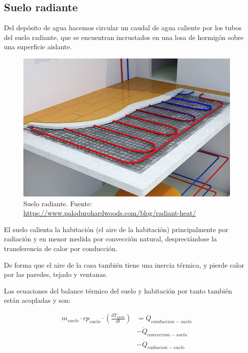 \subsection{Suelo radiante}

Del depósito de agua hacemos circular un caudal de agua caliente por los
tubos del suelo radiante, que se encuentran incrustados en una losa de hormigón
sobre una superficie aislante.

\begin{figure}[h] \centering
	\centering
	\includegraphics[width=1\textwidth]{./capitulos/resultados_discusion/images/radiant_heating_floor.jpg}
	\caption{Suelo radiante. Fuente: \url{https://www.palodurohardwoods.com/blog/radiant-heat/}}
	\label{fig:radiant_heating_floor}
\end{figure}

El suelo calienta la habitación (el aire de la habitación) principalmente por
radiación y en menor medida por convección natural, despreciándose la
transferencia de calor por conducción.

De forma que el aire de la casa también tiene una inercia térmica, y pierde
calor por las paredes, tejado y ventanas.

Las ecuaciones del balance térmico del suelo y habitación por tanto también
están acopladas y son:

\begin{align} \label{eq:floor_energy_conservation}
	m_{suelo} \cdot cp_{suelo} \cdot \left( \frac{dT_{suelo}}{dt} \right) & = \dot{Q}_{conduccion-suelo} \nonumber \\
	                                                                      & - \dot{Q}_{conveccion-suelo} \nonumber \\
	                                                                      & - \dot{Q}_{radiacion-suelo}
\end{align}

